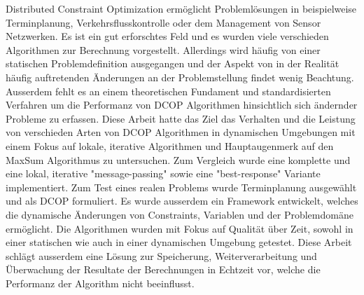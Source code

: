 \begin{zusammenfassung}
Distributed Constraint Optimization erm{\"o}glicht Probleml{\"o}sungen in beispielweise Terminplanung, Verkehrsflusskontrolle oder dem Management von Sensor Netzwerken. Es ist ein gut erforschtes Feld und es wurden viele verschieden Algorithmen zur Berechnung vorgestellt. Allerdings wird h{\"a}ufig von einer statischen Problemdefinition ausgegangen und der Aspekt von in der Realit{\"a}t h{\"a}ufig auftretenden {\"A}nderungen an der Problemstellung findet wenig Beachtung. Ausserdem fehlt es an einem theoretischen Fundament und standardisierten Verfahren um die Performanz von DCOP Algorithmen hinsichtlich sich {\"a}ndernder Probleme zu erfassen. Diese Arbeit hatte das Ziel das Verhalten und die Leistung von verschieden Arten von DCOP Algorithmen in dynamischen Umgebungen mit einem Fokus auf lokale, iterative Algorithmen und Hauptaugenmerk auf den MaxSum Algorithmus zu untersuchen. Zum Vergleich wurde eine komplette und eine lokal, iterative "message-passing" sowie eine "best-response" Variante implementiert. Zum Test eines realen Problems wurde Terminplanung ausgew{\"a}hlt und als DCOP formuliert. Es wurde ausserdem ein Framework entwickelt, welches die dynamische {\"A}nderungen von Constraints, Variablen und der Problemdom{\"a}ne erm{\"o}glicht. Die Algorithmen wurden mit Fokus auf Qualit{\"a}t {\"u}ber Zeit, sowohl in einer statischen wie auch in einer dynamischen Umgebung getestet. Diese Arbeit schl{\"a}gt ausserdem eine L{\"o}sung zur Speicherung, Weiterverarbeitung und {\"U}berwachung der Resultate der Berechnungen in Echtzeit vor, welche die Performanz der Algorithm nicht beeinflusst.
\end{zusammenfassung}


